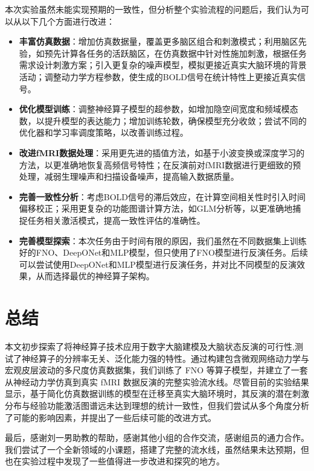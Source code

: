 \documentclass[12pt,a4paper]{article}
\begin{document}
本次实验虽然未能实现预期的一致性，但分析整个实验流程的问题后，我们认为可以从以下几个方面进行改进：
\begin{itemize}
    \item \textbf{丰富仿真数据}：增加仿真数据量，覆盖更多脑区组合和刺激模式；利用脑区先验，如预先计算各任务的活跃脑区，在仿真数据中针对性施加刺激，根据任务需求设计刺激方案；引入更复杂的噪声模型，模拟更接近真实大脑环境的背景活动；调整动力学方程参数，使生成的BOLD信号在统计特性上更接近真实信号。
    \item \textbf{优化模型训练}：调整神经算子模型的超参数，如增加隐空间宽度和频域模态数，以提升模型的表达能力；增加训练轮数，确保模型充分收敛；尝试不同的优化器和学习率调度策略，以改善训练过程。
    \item \textbf{改进fMRI数据处理}：采用更先进的插值方法，如基于小波变换或深度学习的方法，以更准确地恢复高频信号特性；在反演前对fMRI数据进行更细致的预处理，减弱生理噪声和扫描设备噪声，提高输入数据质量。
    \item \textbf{完善一致性分析}：考虑BOLD信号的滞后效应，在计算空间相关性时引入时间偏移校正；采用更复杂的功能图谱计算方法，如GLM分析等，以更准确地捕捉任务相关激活模式，提高一致性评估的准确性。    
    \item \textbf{完善模型探索}：本次任务由于时间有限的原因，我们虽然在不同数据集上训练好的FNO、DeepONet和MLP模型，但只使用了FNO模型进行反演任务。后续可以尝试使用DeepONet和MLP模型进行反演任务，并对比不同模型的反演效果，从而选择最优的神经算子架构。
\end{itemize}

\section{总结}

\indent 本文初步探索了将神经算子技术应用于数字大脑建模及大脑状态反演的可行性,测试了神经算子的分辨率无关、泛化能力强的特性。通过构建包含微观网络动力学与宏观皮层波动的多尺度仿真数据集，我们训练了 FNO 等算子模型，并建立了一套从神经动力学仿真到真实 fMRI 数据反演的完整实验流水线。尽管目前的实验结果显示，基于简化仿真数据训练的模型在迁移至真实大脑环境时，其反演的潜在刺激分布与经验功能激活图谱远未达到理想的统计一致性，但我们尝试从多个角度分析了可能的影响因素，并提出了一些后续可能的改进方式。

最后，感谢刘一男助教的帮助，感谢其他小组的合作交流，感谢组员的通力合作。我们尝试了一个全新领域的小课题，搭建了完整的流水线，虽然结果未达预期，但也在实验过程中发现了一些值得进一步改进和探究的地方。
\end{document}
